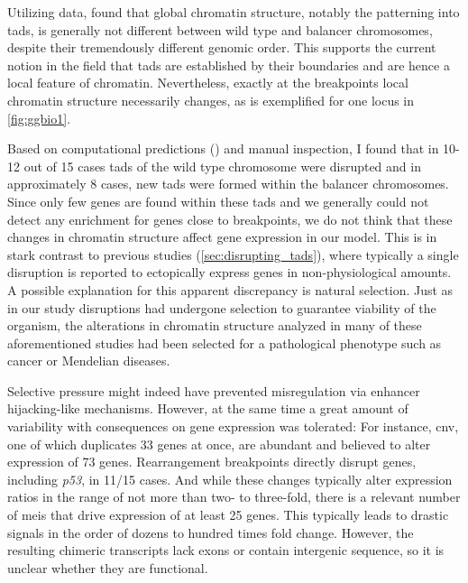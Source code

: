 Utilizing \hic data, \alek found that global chromatin structure, notably the
patterning into \aclp{tad}, is generally not different between wild type and
balancer chromosomes, despite their tremendously different genomic order. This
supports the current notion in the field that \acp{tad} are established by their
boundaries and are hence a local feature of chromatin. Nevertheless, exactly at
the breakpoints local chromatin structure necessarily changes, as is exemplified
for one locus in \cref{fig:ggbio1}.

Based on computational \tad predictions (\alek) and manual inspection, I found
that in 10-12 out of 15 cases \acp{tad} of the wild type chromosome were
disrupted and in approximately 8 cases, new \acp{tad} were formed within the
balancer chromosomes. Since only few \ase genes are found within these \acp{tad}
and we generally could not detect any enrichment for \ase genes close to
breakpoints, we do not think that these changes in chromatin structure affect
gene expression in our model. This is in stark contrast to previous studies
(\cref{sec:disrupting_tads}), where typically a single \tad disruption is
reported to ectopically express genes in non-physiological amounts. A possible
explanation for this apparent discrepancy is natural selection. Just as in our
study \tad disruptions had undergone selection to guarantee viability of the
organism, the alterations in chromatin structure analyzed in many of these
aforementioned studies had been selected for a pathological phenotype such as
cancer or Mendelian diseases.

Selective pressure might indeed have prevented misregulation via enhancer
hijacking-like mechanisms. However, at the same time a great amount of
variability with consequences on gene expression was tolerated: For instance,
\acl{cnv}, one of which duplicates 33 genes at once, are abundant and believed
to alter expression of 73 genes. Rearrangement breakpoints directly disrupt
genes, including \textit{p53}, in 11/15 cases. And while these changes typically
alter expression ratios in the range of not more than two- to three-fold, there
is a relevant number of \aclp{mei} that drive expression of at least 25 genes.
This typically leads to drastic \ase signals in the order of dozens to hundred
times fold change. However, the resulting chimeric transcripts lack exons or
contain intergenic sequence, so it is unclear whether they are functional.

